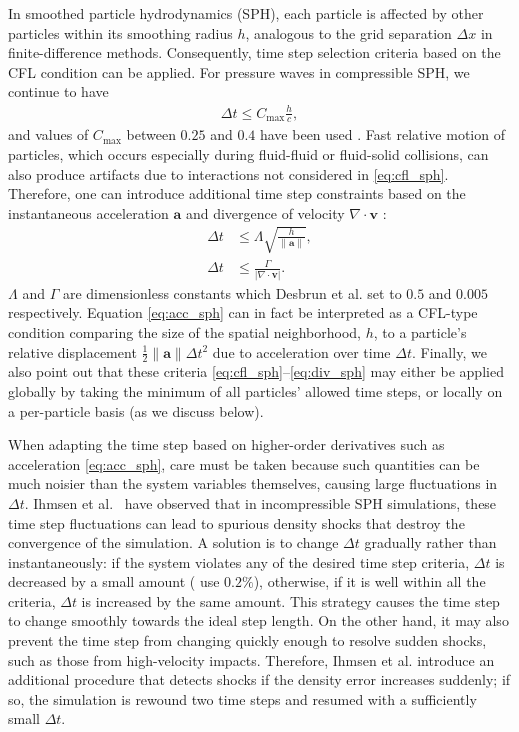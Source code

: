 In smoothed particle hydrodynamics (SPH), each particle is affected by other particles within its smoothing radius $h$, analogous to the grid separation $\Delta x$ in finite-difference methods.
Consequently, time step selection criteria based on the CFL condition can be applied.
For pressure waves in compressible SPH, we continue to have
\begin{align}
  \label{eq:cfl_sph}
  \Delta t \le C_{\max}\frac hc,
\end{align}
and values of $C_{\max}$ between $0.25$ and $0.4$ have been used \cite{Monaghan1992,Desbrun1999}.
Fast relative motion of particles, which occurs especially during fluid-fluid or fluid-solid collisions, can also produce artifacts due to interactions not considered in \eqref{eq:cfl_sph}.
Therefore, one can introduce additional time step constraints based on the instantaneous acceleration $\mathbf a$ and divergence of velocity $\nabla \cdot \mathbf v$ \cite{Monaghan1992,Desbrun1999}:
\begin{align}
    \label{eq:acc_sph}
    \Delta t &\leq \Lambda \sqrt{\frac{h}{\|\mathbf a\|}}, \\
    \label{eq:div_sph}
    \Delta t &\leq \frac{\Gamma}{|\nabla \cdot \mathbf v|}.
\end{align}
$\Lambda$ and $\Gamma$ are dimensionless constants which Desbrun et al. \cite{Desbrun1999} set to $0.5$ and $0.005$ respectively.
Equation \eqref{eq:acc_sph} can in fact be interpreted as a CFL-type condition comparing the size of the spatial neighborhood, $h$, to a particle's relative displacement $\frac12\|\mathbf a\|\Delta t^2$ due to acceleration over time $\Delta t$.
Finally, we also point out that these criteria \eqref{eq:cfl_sph}--\eqref{eq:div_sph} may either be applied globally by taking the minimum of all particles' allowed time steps, or locally on a per-particle basis (as we discuss below).

When adapting the time step based on higher-order derivatives such as acceleration \eqref{eq:acc_sph}, care must be taken because such quantities can be much noisier than the system variables themselves, causing large fluctuations in $\Delta t$.
Ihmsen et al.~\cite{Ihmsen2010} have observed that in incompressible SPH simulations, these time step fluctuations can lead to spurious density shocks that destroy the convergence of the simulation.
A solution is to change $\Delta t$ gradually rather than instantaneously: if the system violates any of the desired time step criteria, $\Delta t$ is decreased by a small amount (\cite{Ihmsen2010} use $0.2\%$), otherwise, if it is well within all the criteria, $\Delta t$ is increased by the same amount.
This strategy causes the time step to change smoothly towards the ideal step length.
On the other hand, it may also prevent the time step from changing quickly enough to resolve sudden shocks, such as those from high-velocity impacts.
Therefore, Ihmsen et al. introduce an additional procedure that detects shocks if the density error increases suddenly; if so, the simulation is rewound two time steps and resumed with a sufficiently small $\Delta t$.

